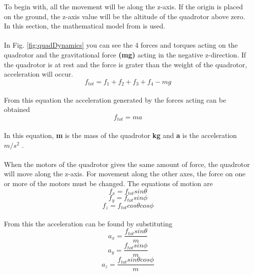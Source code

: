To begin with, all the movement will be along the z-axis. If the origin is placed on the ground, the z-axis value will be the altitude of the quadrotor above zero. In this section, the mathematical model from \cite{charlesdarwinuni} is used. 
\\\\
In Fig. \ref{fig:quadDynamics} you can see the 4 forces and torques acting on the quadrotor and the gravitational force \textbf{(mg)} acting in the negative z-direction. If the quadrotor is at rest and the force is grater than the weight of the quadrotor, acceleration will occur. 
\begin{equation}
  f_{tot} = f_1 + f_2 + f_3 + f_4 - mg
\end{equation}
\\
From this equation the acceleration generated by the forces acting can be obtained 
\\
\begin{equation}
  f_{tot} = ma
\end{equation}
\\
In this equation, \textbf{m} is the mass of the quadrotor \textbf{kg} and \textbf{a} is the acceleration \textbf{$m/s^2$} .
\\\\
When the motors of the quadrotor gives the same amount of force, the quadrotor will move along the z-axis. For movement along the other axes, the force on one or more of the motors must be changed. The equations of motion are
\\
\begin{equation}
f_x = f_{tot}sin\theta
\end{equation}
\begin{equation}
f_y = f_{tot}sin\phi
\end{equation}
\begin{equation}
f_z = f_{tot}cos\theta cos\phi
\end{equation}
\\
From this the acceleration can be found by substituting
\\
\begin{equation}
a_x = \frac{f_{tot}sin\theta}{m}
\end{equation}
\begin{equation}
a_y = \frac{f_{tot}sin\phi}{m}
\end{equation}
\begin{equation}
a_z = \frac{f_{tot}sin\theta cos\phi}{m}
\end{equation}
\\
